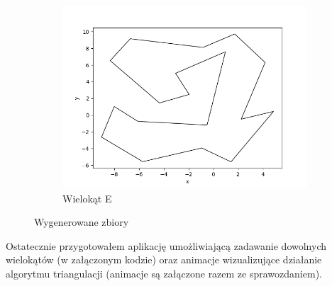 \documentclass[11pt,a4paper]{article}
\begin{document}
\begin{figure}[H]
\begin{subfigure}[b]{0.46\textwidth}
        \includegraphics[scale=0.4]{res/pol_e.png}
        \caption{
            Wielokąt E
        }
    \end{subfigure}
    \caption{Wygenerowane zbiory}
\end{figure}

Ostatecznie przygotowałem aplikację umożliwiającą zadawanie dowolnych wielokątów
(w załączonym kodzie) oraz animacje wizualizujące działanie algorytmu triangulacji
(animacje są załączone razem ze sprawozdaniem).

\pagebreak
\end{document}
